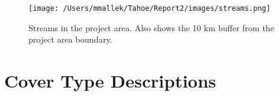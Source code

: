\begin{figure}[htbp]
\centering
\texttt{[image: /Users/mmallek/Tahoe/Report2/images/streams.png]}
\caption{Streams in the project area. Also shows the 10 km buffer from the project area boundary.} 
\label{streamsmap}
\end{figure}

\chapter{Cover Type Descriptions}
\label{sec:covertypedesc}















